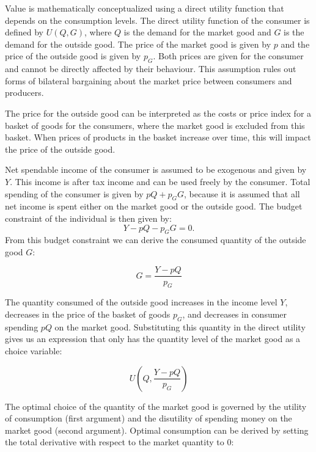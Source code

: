 \documentclass[
]{book}
\begin{document}
Value is mathematically conceptualized using a direct utility function that depends on the consumption levels. The direct utility function of the consumer is defined by \(U(Q,G)\), where \(Q\) is the demand for the market good and \(G\) is the demand for the outside good. The price of the market good is given by \(p\) and the price of the outside good is given by \(p_G\). Both prices are given for the consumer and cannot be directly affected by their behaviour. This assumption rules out forms of bilateral bargaining about the market price between consumers and producers.

The price for the outside good can be interpreted as the costs or price index for a basket of goods for the consumers, where the market good is excluded from this basket. When prices of products in the basket increase over time, this will impact the price of the outside good.

Net spendable income of the consumer is assumed to be exogenous and given by \(Y\). This income is after tax income and can be used freely by the consumer. Total spending of the consumer is given by \(pQ+p_G G\), because it is assumed that all net income is spent either on the market good or the outside good. The budget constraint of the individual is then given by:
\begin{equation}
Y - pQ - p_G G = 0.
\label{eq:budgetconstraint}
\end{equation}
From this budget constraint we can derive the consumed quantity of the outside good \(G\):

\begin{equation}
G = \frac{Y-pQ}{p_G}
\label{eq:outsidegood}
\end{equation}

The quantity consumed of the outside good increases in the income level \(Y\), decreases in the price of the basket of goods \(p_G\), and decreases in consumer spending \(pQ\) on the market good. Substituting this quantity in the direct utility gives us an expression that only has the quantity level of the market good as a choice variable:

\begin{equation}
U \left(Q, \frac{Y-pQ}{p_G} \right) 
\end{equation}

The optimal choice of the quantity of the market good is governed by the utility of consumption (first argument) and the disutility of spending money on the market good (second argument). Optimal consumption can be derived by setting the total derivative with respect to the market quantity to 0:
\end{document}
